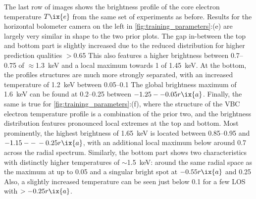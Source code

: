        The last row of images shows the brightness profile of the core electron temperature $T\ix{e}$ from the same set of experiments as before. Results for the horizontal bolometer camera on the left in \cref{fig:training_parameters}:(e) are largely very similar in shape to the two prior plots. The gap in-between the top and bottom part is slightly increased due to the reduced distribution for higher prediction qualities $>$\SI{0.65}{\arbitraryunit} This also features a higher brightness between \SIrange{0.7}{0.75}{\arbitraryunit} of $\approx$\SI{1.3}{\kilo\electronvolt} and a local maximum towards \SI{1}{\arbitraryunit} of \SI{1.45}{\kilo\electronvolt}. At the bottom, the profiles structures are much more strongly separated, with an increased temperature of \SI{1.2}{\kilo\electronvolt} between \SIrange{0.05}{0.1}{\arbitraryunit} The global brightness maximum of \SI{1.6}{\kilo\electronvolt} can be found at \SIrange{0.2}{0.25}{\arbitraryunit} between $-1.25--0.05r\ix{a}$. Finally, the same is true for \cref{fig:training_parameters}:(f), where the structure of the VBC electron temperature profile is a combination of the prior two, and the brightness distribution features pronounced local extremes at the top and bottom. Most prominently, the highest brightness of \SI{1.65}{\kilo\electronvolt} is located between \SIrange{0.85}{0.95}{\arbitraryunit} and $-1.15--\,-0.25r\ix{a}$, with an additional local maximum below around \SI{0.7}{\arbitraryunit} across the radial spectrum. Similarly, the bottom part shows two characteristics with distinctly higher temperatures of $\sim$\SI{1.5}{\kilo\electronvolt}: around the same radial space as the maximum at up to \SI{0.05}{\arbitraryunit} and a singular bright spot at $-0.55r\ix{a}$ and \SI{0.25}{\arbitraryunit} Also, a slightly increased temperature can be seen just below \SI{0.1}{\arbitraryunit} for a few LOS with $>-0.25r\ix{a}$.\\%
